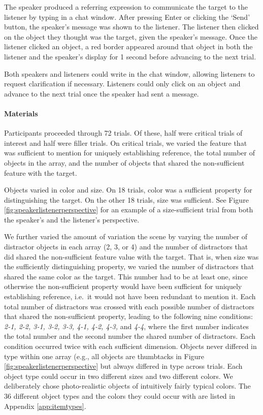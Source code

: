 \documentclass[11pt]{article}
\newcommand{\figref}[1]{Figure \ref{#1}}
\newcommand{\appref}[1]{Appendix \ref{#1}}
\begin{document}
The speaker produced a referring expression to communicate the target to the listener by typing in a chat window. After pressing Enter or clicking the `Send' button, the speaker's message was shown to the listener. The listener then clicked on the object they thought was the target, given the speaker's message.  Once the listener clicked an object, a red border appeared around that object in both the listener and the speaker's display for 1 second before advancing to the next trial.

Both speakers and listeners could write in the chat window, allowing listeners to request clarification if necessary. Listeners could only click on an object and advance to the next trial once the speaker had sent a message. 


\paragraph{Materials}

Participants proceeded through 72 trials. Of these, half were critical trials of interest and half were filler trials. On critical trials, we varied the feature that was sufficient to mention for uniquely establishing reference, the total number of objects in the array, and  the number of objects that shared the non-sufficient feature with the target. 

Objects varied in color and size. On 18 trials, color was a sufficient property for distinguishing the target. On the other 18 trials, size was sufficient. See \figref{fig:speakerlistenerperspective} for an example of a size-sufficient trial from both the speaker's and the listener's perspective. 

We further varied the amount of variation the scene by varying the number of distractor objects in each array (2, 3, or  4) and the number of distractors that did shared the non-sufficient feature value with the target. That is, when size was the sufficiently distinguishing property, we varied the number of distractors that shared the same color as the target. This number had to be at least one, since otherwise the non-sufficient property would have been sufficient for uniquely establishing reference, i.e.~it would not have been redundant to mention it. Each total number of distractors was crossed with each possible number of distractors that shared the non-sufficient property, leading to the following nine conditions: \emph{2-1, 2-2, 3-1, 3-2, 3-3, 4-1, 4-2, 4-3,} and \emph{4-4}, where the first number indicates the total number and the second number the shared number of distractors. Each condition occurred twice with each sufficient dimension. Objects never differed in type within one array (e.g., all objects are thumbtacks in \figref{fig:speakerlistenerperspective} but always differed in type across trials. Each object type could occur in two different sizes and two different colors. We deliberately chose photo-realistic objects of intuitively fairly typical colors. The 36 different object types and the colors they could occur with are listed in \appref{app:itemtypes}. 
\end{document}

